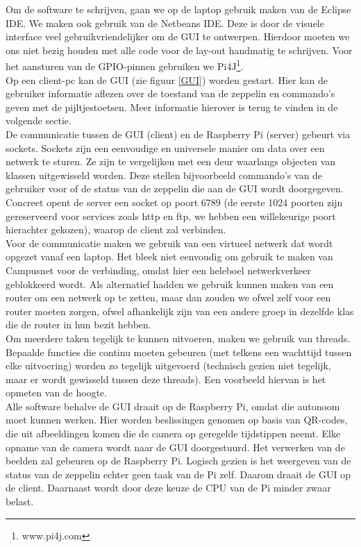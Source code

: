 \documentclass[tt]{penoverslag}
\begin{document}
Om de software te schrijven, gaan we op de laptop gebruik maken van de Eclipse IDE. We maken ook gebruik van de Netbeans IDE. Deze is door de visuele interface veel gebruikvriendelijker om de GUI te ontwerpen. Hierdoor moeten we ons niet bezig houden met alle code voor de lay-out handmatig te schrijven. Voor het aansturen van de GPIO-pinnen gebruiken we Pi4J\footnote{www.pi4j.com}.\\

Op een client-pc kan de GUI (zie figuur \ref{GUI}) worden gestart. Hier kan de gebruiker informatie aflezen over de toestand van de zeppelin en commando's geven met de pijltjestoetsen. Meer informatie hierover is terug te vinden in de volgende sectie. \\

De communicatie tussen de GUI (client) en de Raspberry Pi (server) gebeurt via sockets. Sockets zijn een eenvoudige en universele manier om data over een netwerk te sturen. Ze zijn te vergelijken met een deur waarlangs objecten van klassen uitgewisseld worden. Deze stellen bijvoorbeeld commando's van de gebruiker voor of de status van de zeppelin die aan de GUI wordt doorgegeven. Concreet opent de server een socket op poort 6789 (de eerste 1024 poorten zijn gereserveerd voor services zoals http en ftp, we hebben een willekeurige poort hierachter gekozen), waarop de client zal verbinden. \\

Voor de communicatie maken we gebruik van een virtueel netwerk dat wordt opgezet vanaf een laptop. Het bleek niet eenvoudig om gebruik te maken van Campusnet voor de verbinding, omdat hier een heleboel netwerkverkeer geblokkeerd wordt. Als alternatief hadden we gebruik kunnen maken van een router om een netwerk op te zetten, maar dan zouden we ofwel zelf voor een router moeten zorgen, ofwel afhankelijk zijn van een andere groep in dezelfde klas die de router in hun bezit hebben. \\

Om meerdere taken tegelijk te kunnen uitvoeren, maken we gebruik van threads. Bepaalde functies die continu moeten gebeuren (met telkens een wachttijd tussen elke uitvoering) worden zo tegelijk uitgevoerd (technisch gezien niet tegelijk, maar er wordt gewisseld tussen deze threads). Een voorbeeld hiervan is het opmeten van de hoogte.\\

Alle software behalve de GUI draait op de Raspberry Pi, omdat die autonoom moet kunnen werken. Hier worden beslissingen genomen op basis van QR-codes, die uit afbeeldingen komen die de camera op geregelde tijdstippen neemt. Elke opname van de camera wordt naar de GUI doorgestuurd. Het verwerken van de beelden zal gebeuren op de Raspberry Pi. Logisch gezien is het weergeven van de status van de zeppelin echter geen taak van de Pi zelf. Daarom draait de GUI op de client. Daarnaast wordt door deze keuze de CPU van de Pi minder zwaar belast. \\
\end{document}
